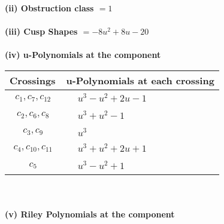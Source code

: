 \documentclass[1p]{elsarticle_modified}
\theoremstyle{definition}
\begin{document}
\flushleft \textbf{(ii) Obstruction class $= 1$}\\~\\
\flushleft \textbf{(iii) Cusp Shapes $= -8 u^2+8 u-20$}\\~\\
\newpage\renewcommand{\arraystretch}{1}
\flushleft \textbf{(iv) u-Polynomials at the component}\newline \\
\begin{tabular}{m{50pt}|m{274pt}}
Crossings & \hspace{64pt}u-Polynomials at each crossing \\
\hline $$\begin{aligned}c_{1},c_{7},c_{12}\end{aligned}$$&$\begin{aligned}
&u^3- u^2+2 u-1
\end{aligned}$\\
\hline $$\begin{aligned}c_{2},c_{6},c_{8}\end{aligned}$$&$\begin{aligned}
&u^3+u^2-1
\end{aligned}$\\
\hline $$\begin{aligned}c_{3},c_{9}\end{aligned}$$&$\begin{aligned}
&u^3
\end{aligned}$\\
\hline $$\begin{aligned}c_{4},c_{10},c_{11}\end{aligned}$$&$\begin{aligned}
&u^3+u^2+2 u+1
\end{aligned}$\\
\hline $$\begin{aligned}c_{5}\end{aligned}$$&$\begin{aligned}
&u^3- u^2+1
\end{aligned}$\\
\hline
\end{tabular}\\~\\
\newpage\renewcommand{\arraystretch}{1}
\flushleft \textbf{(v) Riley Polynomials at the component}\newline \\
\end{document}
